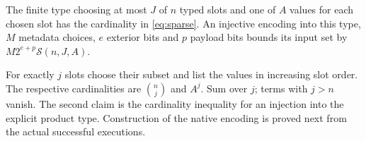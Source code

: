 \begin{lemma}\label{lem:sparse-menu}
The finite type choosing at most $J$ of $n$ typed slots and one of $A$ values
for each chosen slot has the cardinality in \cref{eq:sparse}. An injective
encoding into this type, $M$ metadata choices, $e$ exterior bits and $p$ payload
bits bounds its input set by $M2^{e+p}\mathcal S(n,J,A)$.
\end{lemma}
\begin{outline}
For exactly $j$ slots choose their subset and list the values in increasing
slot order. The respective cardinalities are $\binom nj$ and $A^j$. Sum over
$j$; terms with $j>n$ vanish. The second claim is the cardinality inequality
for an injection into the explicit product type. Construction of the native
encoding is proved next from the actual successful executions.
\end{outline}

